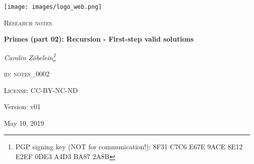 

\begin{titlepage}
	\begin{center}
    \begin{center}
            \texttt{[image: images/logo\_web.png]}
    \end{center}
    \vspace{1cm}
	{\scshape\Large Research notes\par}
	\vspace{1.5cm}
	{\huge\bfseries Primes (part 02): Recursion - First-step valid solutions\par}
	\vspace{2cm}
	{\Large\itshape Carolin Z\"obelein\footnote{PGP signing key (NOT for communication!): 8F31 C7C6 E67E 9ACE 8E12 E2EF 0DE3 A4D3 BA87 2A8B}\par}
	\vfill
	\textsc{id: notes\_0002}\par
	\textsc{License: CC-BY-NC-ND}
	\vfill


	\vfill

	{\large Version: v01\par}
	{\large May 10, 2019\par}
	\end{center}
\end{titlepage}

